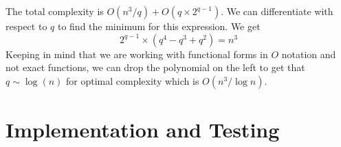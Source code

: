 \documentclass[journal]{IEEEtran}
\begin{document}
The total complexity is $O(n^3/q) + O(q\times 2^{q-1})$. We can differentiate with respect to $q$ to find the minimum for this expression. We get
\[
2^{q-1} \times (q^4 - q^3 + q^2)= {n^3}
\]
Keeping in mind that we are working with functional forms in $O$ notation and not exact functions, we can drop the polynomial on the left to get that $q \sim \log(n)$ for optimal complexity which is $O(n^3/\log n)$.



\section{Implementation and Testing}
\end{document}
